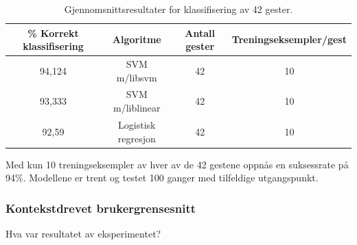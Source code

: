\begin{table}[h!]
\centering
\begin{tabular}{|| c c c c ||}
\hline
\% Korrekt klassifisering & Algoritme & Antall gester & Treningseksempler/gest\\ [0.5ex] 
 \hline\hline
 94,124 & SVM m/libsvm & 42 & 10 \\ 
 \hline
 93,333 & SVM m/liblinear & 42 & 10 \\
 \hline
 92,59 & Logistisk regresjon & 42 & 10 \\ [1ex]
 \hline
\end{tabular}
\caption{Gjennomsnittsresultater for klassifisering av 42 gester.}
\label{table:results-foursensors}
\end{table}

Med kun 10 treningseksempler av hver av de 42 gestene oppnås en suksessrate på 94\%. Modellene er trent og testet 100 ganger med tilfeldige utgangspunkt.

\subsubsection{Kontekstdrevet brukergrensesnitt}
{\color{red}Hva var resultatet av eksperimentet?}
